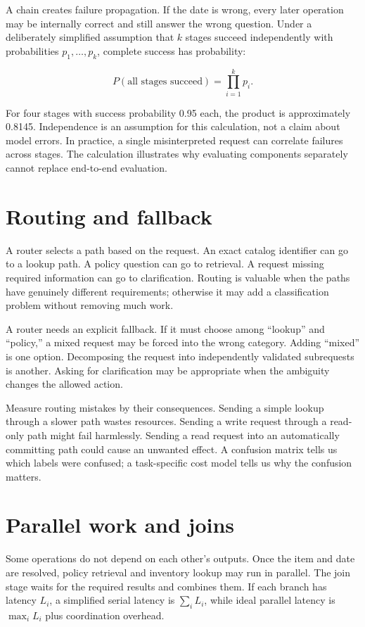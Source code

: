 A chain creates failure propagation. If the date is wrong, every later operation may be internally correct and still answer the wrong question. Under a deliberately simplified assumption that \(k\) stages succeed independently with probabilities \(p_1,\ldots,p_k\), complete success has probability:

\begin{equation}
P(\text{all stages succeed})=\prod_{i=1}^{k}p_i.
\end{equation}

For four stages with success probability 0.95 each, the product is approximately 0.8145. Independence is an assumption for this calculation, not a claim about model errors. In practice, a single misinterpreted request can correlate failures across stages. The calculation illustrates why evaluating components separately cannot replace end-to-end evaluation.

\section{Routing and fallback}
A router selects a path based on the request. An exact catalog identifier can go to a lookup path. A policy question can go to retrieval. A request missing required information can go to clarification. Routing is valuable when the paths have genuinely different requirements; otherwise it may add a classification problem without removing much work.

A router needs an explicit fallback. If it must choose among “lookup” and “policy,” a mixed request may be forced into the wrong category. Adding “mixed” is one option. Decomposing the request into independently validated subrequests is another. Asking for clarification may be appropriate when the ambiguity changes the allowed action.

Measure routing mistakes by their consequences. Sending a simple lookup through a slower path wastes resources. Sending a write request through a read-only path might fail harmlessly. Sending a read request into an automatically committing path could cause an unwanted effect. A confusion matrix tells us which labels were confused; a task-specific cost model tells us why the confusion matters.

\section{Parallel work and joins}
Some operations do not depend on each other's outputs. Once the item and date are resolved, policy retrieval and inventory lookup may run in parallel. The join stage waits for the required results and combines them. If each branch has latency \(L_i\), a simplified serial latency is \(\sum_i L_i\), while ideal parallel latency is \(\max_i L_i\) plus coordination overhead.

